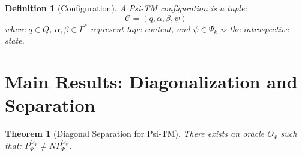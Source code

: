 \documentclass[11pt]{article}
\newtheorem{theorem}{Theorem}
\newtheorem{definition}{Definition}
\begin{document}
\begin{definition}[Configuration]
A Psi-TM configuration is a tuple:
$$\mathcal{C} = (q, \alpha, \beta, \psi)$$
where $q \in Q$, $\alpha, \beta \in \Gamma^*$ represent tape content, and $\psi \in \Psi_k$ is the introspective state.
\end{definition}

\section{Main Results: Diagonalization and Separation}

\begin{theorem}[Diagonal Separation for Psi-TM]
\label{thm:diagonal}
There exists an oracle $O_\Psi$ such that: $P^{O_\Psi}_\Psi \neq NP^{O_\Psi}_\Psi$.
\end{theorem}
\end{document}
